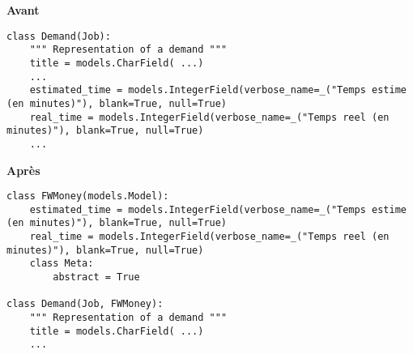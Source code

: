 \begin{minipage}{.5\textwidth}
\begin{center} \textbf{Avant}\end{center}
\begin{lstlisting}
class Demand(Job):
    """ Representation of a demand """
    title = models.CharField( ...)
    ...
    estimated_time = models.IntegerField(verbose_name=_("Temps estime (en minutes)"), blank=True, null=True)
    real_time = models.IntegerField(verbose_name=_("Temps reel (en minutes)"), blank=True, null=True)
    ...
\end{lstlisting} 
\end{minipage}
\hspace{0.3cm}
\begin{minipage}{.5\textwidth}
\begin{center} \textbf{Après}\end{center}
\begin{lstlisting}
class FWMoney(models.Model):
    estimated_time = models.IntegerField(verbose_name=_("Temps estime (en minutes)"), blank=True, null=True)
    real_time = models.IntegerField(verbose_name=_("Temps reel (en minutes)"), blank=True, null=True)
    class Meta:
        abstract = True

class Demand(Job, FWMoney):
    """ Representation of a demand """
    title = models.CharField( ...)
    ...
\end{lstlisting} 
\end{minipage}


